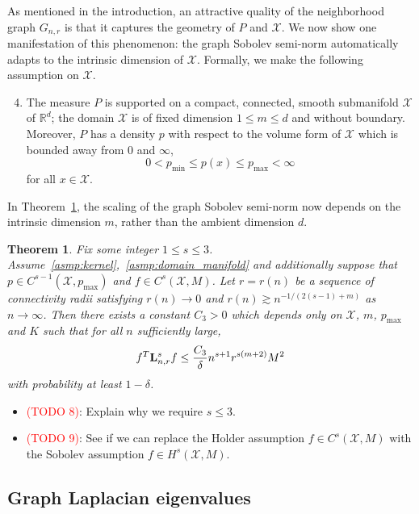 \documentclass{article}
\newcommand{\Reals}{\mathbb{R}}
\newcommand{\1}{\mathbf{1}}
\newcommand{\Lap}{{\bf L}}
\newcommand{\Xset}{\mathcal{X}}
\theoremstyle{alden}
\theoremstyle{aldenthm}
\newtheorem{theorem}{Theorem}
\theoremstyle{definition}
\theoremstyle{remark}
\begin{document}
As mentioned in the introduction, an attractive quality of the neighborhood graph $G_{n,r}$ is that it captures the geometry of $P$ and $\Xset$. We now show one manifestation of this phenomenon: the graph Sobolev semi-norm automatically adapts to the intrinsic dimension of $\Xset$. Formally, we make the following assumption on $\Xset$.
\begin{enumerate}[label=(P\arabic*)]
	\setcounter{enumi}{3}
	\item 
	\label{asmp:domain_manifold}
	The measure $P$ is supported on a compact, connected, smooth submanifold $\Xset$ of $\Reals^d$; the domain $\Xset$ is of fixed dimension $1 \leq m \leq d$ and without boundary. Moreover, $P$ has a density $p$ with respect to the volume form of $\Xset$ which is bounded away from $0$ and $\infty$,
	\begin{equation*}
	0 < p_{\min} \leq p(x) \leq p_{\max} < \infty
	\end{equation*}
	for all $x \in \Xset$.
\end{enumerate}
In Theorem~\ref{thm:manifold_graph_sobolev_seminorm}, the scaling of the graph Sobolev semi-norm now depends on the intrinsic dimension $m$, rather than the ambient dimension $d$.
\begin{theorem}
	\label{thm:manifold_graph_sobolev_seminorm}
	Fix some integer $1 \leq s \leq 3$. Assume~\ref{asmp:kernel},~\ref{asmp:domain_manifold} and additionally suppose that $p \in C^{s - 1}(\Xset,p_{\max})$ and $f \in C^s(\Xset,M)$. Let $r = r(n)$ be a sequence of connectivity radii satisfying $r(n) \to 0$ and $r(n) \gtrsim n^{-1/(2(s - 1) + m)}$ as $n \to \infty$. Then there exists a constant $C_3 > 0$ which depends only on $\Xset$, $m$, $p_{\max}$ and $K$ such that for all $n$ sufficiently large,
	\begin{equation*}
	f^T \Lap_{n,r}^s f \leq \frac{C_3}{\delta}n^{s + 1}r^{s(m + 2)}M^2
	\end{equation*}
	with probability at least $1 - \delta$.
\end{theorem}
\begin{itemize}
	\item \textcolor{red}{(TODO 8)}: Explain why we require $s \leq 3$.
	\item \textcolor{red}{(TODO 9)}: See if we can replace the Holder assumption $f \in C^s(\Xset,M)$ with the Sobolev assumption $f \in H^s(\Xset,M)$.
\end{itemize}

\subsection{Graph Laplacian eigenvalues}
\end{document}
